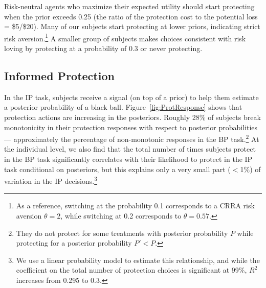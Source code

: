\documentclass[12pt,a4paper]{article}
\begin{document}
Risk-neutral agents who maximize their expected utility should start protecting when the prior exceeds 0.25 (the ratio of the protection cost to the potential loss = \$5/\$20). Many of our subjects start protecting at lower priors, indicating strict risk aversion.\footnote{As a reference, switching at the probability 0.1 corresponds to a CRRA risk aversion $\theta=2$, while switching at 0.2 corresponds to $\theta=0.57$.}  A smaller group of subjects makes choices consistent with risk loving by protecting at a probability of 0.3 or never protecting. 

\subsection{Informed Protection}

In the IP task, subjects receive a signal (on top of a prior) to help them estimate a posterior probability of a black ball. 
Figure~\ref{fig:ProtResponse} shows that protection actions are increasing in the posteriors. Roughly 28\% of subjects break monotonicity in their protection responses with respect to posterior probabilities --- approximately the percentage of non-monotonic responses in the BP task.\footnote{ They do not protect for some treatments with posterior probability $P$ while protecting for a posterior probability $P'<P$.}  At the individual level, we also find that the total number of times subjects protect in the BP task significantly correlates with their likelihood to protect in the IP task conditional on posteriors, but this explains only a very small part ($<$1\%) of variation in the IP decisions.\footnote{We use a linear probability model to estimate this relationship, and while the coefficient on the total number of protection choices is significant at 99\%, $R^2$ increases from 0.295 to 0.3.} 


\end{document}
